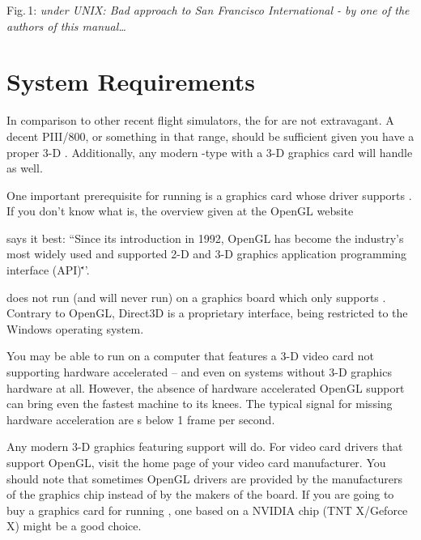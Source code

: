 \smallskip
 \noindent
Fig.\,1: \textit{\FlightGear{} under UNIX: Bad approach to San Francisco International - by one of the authors of this manual\ldots}

\section{System Requirements}
In comparison to other recent flight simulators, the  for
\FlightGear{} are not extravagant. A decent PIII/800, or something in that range, should be
sufficient given you have a proper 3-D . Additionally, any
modern -type  with a 3-D graphics card will handle
\FlightGear{} as well.

One important prerequisite for running \FlightGear{} is a graphics card whose driver supports
. If you don't know what  is, the overview given at the OpenGL website
\medskip

\medskip

\noindent
 says it best: ``Since its introduction in 1992, OpenGL has become the
industry's most widely used and supported 2-D and 3-D graphics application programming
interface (API)\.\.\.''.

\FlightGear{} does not run (and will never run) on a graphics board which only supports
. Contrary to OpenGL, Direct3D is a proprietary interface, being restricted to
the Windows operating system.

You may be able to run \FlightGear{} on a computer that features a 3-D video card not
supporting hardware accelerated  -- and even on systems without 3-D
graphics hardware at all. However, the absence of hardware accelerated OpenGL support can bring even the fastest machine to its knees. The typical signal for missing hardware acceleration
are s below 1 frame per second.

Any modern 3-D graphics featuring  support will do. For
 video card drivers that support OpenGL, visit the home page of your video
card manufacturer. You should note that sometimes OpenGL drivers
are provided by the manufacturers of the graphics chip instead of by the makers of the
board. If you are going to buy a graphics card for running \FlightGear{}, one based on a
NVIDIA chip (TNT X/Geforce X) might be a good choice.

